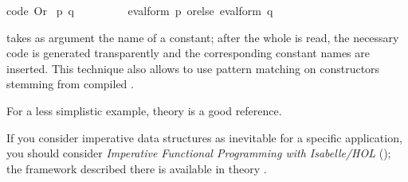\begin{isabellebody}
\isaantiq
code\ Or%
\endisaantiq
\ {\isacharparenleft}p{\isacharcomma}\ q{\isacharparenright}{\isacharparenright}\ {\isacharequal}\isanewline
\ \ \ \ \ \ \ \ eval{\isacharunderscore}form\ p\ orelse\ eval{\isacharunderscore}form\ q{\isacharsemicolon}\isanewline
{\isacharverbatimclose}%
\endisatagquotett
{\isafoldquotett}%
%
\isadelimquotett
%
\endisadelimquotett
%
\begin{isamarkuptext}%
\noindent {} takes as argument the name of a constant;  after the
  whole  is read, the necessary code is generated transparently
  and the corresponding constant names are inserted.  This technique also
  allows to use pattern matching on constructors stemming from compiled
  .

  For a less simplistic example, theory \hyperlink{theory.Ferrack}{\mbox{}} is
  a good reference.%
\end{isamarkuptext}%
\isamarkuptrue%
%
\isamarkuptrue%
%
\begin{isamarkuptext}%
If you consider imperative data structures as inevitable for a specific
  application, you should consider
  \emph{Imperative Functional Programming with Isabelle/HOL}
  (\cite{bulwahn-et-al:2008:imperative});
  the framework described there is available in theory \hyperlink{theory.Imperative-HOL}{\mbox{}}.%
\end{isamarkuptext}%
\isamarkuptrue%
%
\isadelimtheory
%
\endisadelimtheory
%
\isatagtheory
{}\isamarkupfalse%
%
\endisatagtheory
{\isafoldtheory}%
%
\isadelimtheory
%
\endisadelimtheory
\isanewline
\end{isabellebody}%
